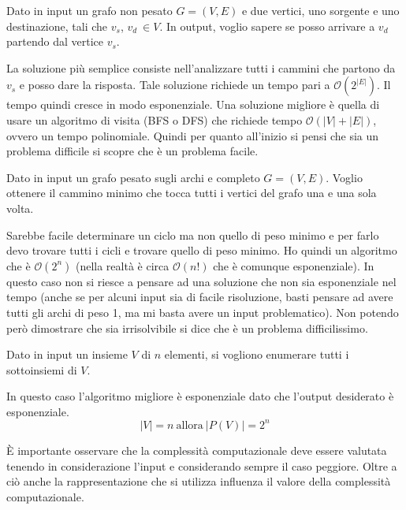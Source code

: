 \begin{esempio} 
    Dato in input un grafo non pesato $G = (V,E)$ e due vertici, uno sorgente e
    uno destinazione, tali che $v_s$, $v_d \ \in V$. In output, voglio sapere se
    posso arrivare a $v_d$ partendo dal vertice $v_s$.

    La soluzione più semplice consiste nell'analizzare tutti i cammini che partono
    da $v_s$ e posso dare la risposta. Tale soluzione richiede un tempo pari a
    $\mathcal{O}(2^{|E|})$. Il tempo quindi cresce in modo esponenziale. Una
    soluzione migliore è quella di usare un algoritmo di visita (BFS o DFS) che
    richiede tempo $\mathcal{O}(|V | + |E|)$, ovvero un tempo polinomiale. Quindi
    per quanto all'inizio si pensi che sia un problema difficile si scopre che è
    un problema facile.
\end{esempio}
\begin{esempio}
    Dato in input un grafo pesato sugli archi e completo $G = (V,E)$. Voglio ottenere
    il cammino minimo che tocca tutti i vertici del grafo una e una sola volta.

    Sarebbe facile determinare un ciclo ma non quello di peso minimo e per farlo
    devo trovare tutti i cicli e trovare quello di peso minimo. Ho quindi un algoritmo
    che è $\mathcal{O}(2^n)$ (nella realtà è circa $\mathcal{O}(n!)$ che è comunque esponenziale).
    In questo caso non si riesce a pensare ad una soluzione che non sia esponenziale
    nel tempo (anche se per alcuni input sia di facile risoluzione, basti pensare
    ad avere tutti gli archi di peso 1, ma mi basta avere un input problematico).
    Non potendo però dimostrare che sia irrisolvibile si dice che è un problema difficilissimo.
\end{esempio}
\begin{esempio} 
    Dato in input un insieme $V$ di $n$ elementi, si vogliono enumerare tutti i
    sottoinsiemi di $V$.

    In questo caso l'algoritmo migliore è esponenziale dato che l'output desiderato
    è esponenziale.
    \begin{equation}
        |V| = n \ \text{allora} \ |P(V)| = 2^n
    \end{equation}
\end{esempio}

È importante osservare che la complessità computazionale deve essere valutata tenendo
in considerazione l'input e considerando sempre il caso peggiore. Oltre a ciò anche
la rappresentazione che si utilizza influenza il valore della complessità computazionale.